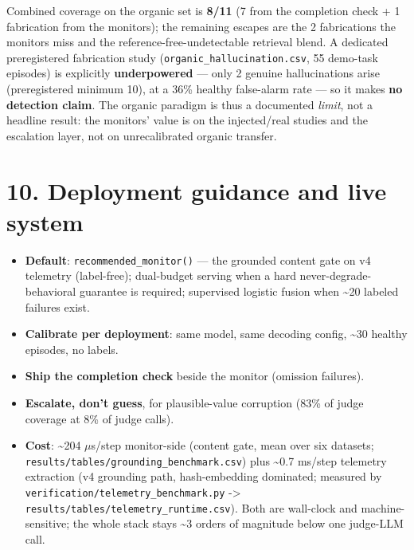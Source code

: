 \documentclass[11pt]{article}
\begin{document}
Combined coverage on the organic set is \textbf{8/11} (7 from the completion check + 1 fabrication from the monitors); the remaining escapes are the 2 fabrications the monitors miss and the reference-free-undetectable retrieval blend. A dedicated preregistered fabrication study (\texttt{organic\_\allowbreak{}hallucination.csv}, 55 demo-task episodes) is explicitly \textbf{underpowered} --- only 2 genuine hallucinations arise (preregistered minimum 10), at a 36\% healthy false-alarm rate --- so it makes \textbf{no detection claim}. The organic paradigm is thus a documented \emph{limit}, not a headline result: the monitors' value is on the injected/real studies and the escalation layer, not on unrecalibrated organic transfer.


\section{10. Deployment guidance and live system}


\begin{itemize}
\item \textbf{Default}: \texttt{recommended\_\allowbreak{}monitor()} --- the grounded content gate on v4 telemetry (label-free); dual-budget serving when a hard never-degrade-behavioral guarantee is required; supervised logistic fusion when \textasciitilde{}20 labeled failures exist.
\item \textbf{Calibrate per deployment}: same model, same decoding config, \textasciitilde{}30 healthy episodes, no labels.
\item \textbf{Ship the completion check} beside the monitor (omission failures).
\item \textbf{Escalate, don't guess}, for plausible-value corruption (83\% of judge coverage at 8\% of judge calls).
\item \textbf{Cost}: \textasciitilde{}204 $\mu$s/step monitor-side (content gate, mean over six datasets; \texttt{results/\allowbreak{}tables/\allowbreak{}grounding\_\allowbreak{}benchmark.csv}) plus \textasciitilde{}0.7 ms/step telemetry extraction (v4 grounding path, hash-embedding dominated; measured by \texttt{verification/\allowbreak{}telemetry\_\allowbreak{}benchmark.py} -> \texttt{results/\allowbreak{}tables/\allowbreak{}telemetry\_\allowbreak{}runtime.csv}). Both are wall-clock and machine-sensitive; the whole stack stays \textasciitilde{}3 orders of magnitude below one judge-LLM call.
\end{itemize}
\end{document}
